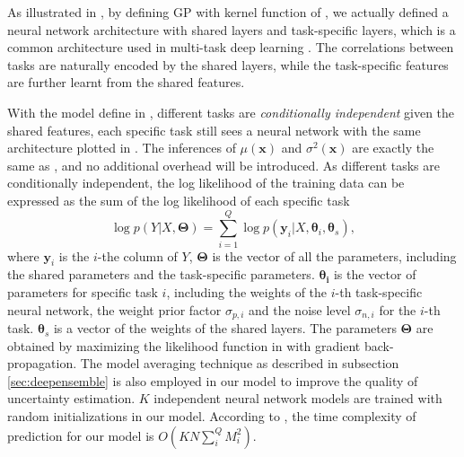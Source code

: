 As illustrated in , by defining GP with kernel function of , we actually defined a neural network architecture with shared layers and task-specific layers, which is a common architecture used in multi-task deep learning \cite{ruder2017overview}. The correlations between tasks are naturally encoded by the shared layers, while the task-specific features are further learnt from the shared features.

With the model define in , different tasks are \emph{conditionally independent} given the shared features, each specific task still sees a neural network with the same architecture plotted in . The inferences of $\mu(\bm{x})$ and $\sigma^2(\bm{x})$ are exactly the same as , and no additional overhead will be introduced. As different tasks are conditionally independent, the log likelihood of the training data can be expressed as the sum of the log likelihood of each specific task
\begin{equation}
    \label{eq:mo_likelihood}
    \log p(Y | X, \bm{\Theta}) = \sum_{i=1}^Q \log p(\bm{y}_i | X, \bm{\theta}_i, \bm{\theta}_s),
\end{equation}
where $\bm{y}_i$ is the $i$-the column of $Y$, $\bm{\Theta}$ is the vector of all the parameters, including the shared parameters and the task-specific parameters. $\bm{\theta_i}$ is the vector of parameters for specific task $i$, including the weights of the $i$-th task-specific neural network, the weight prior factor $\sigma_{p, i}$ and the noise level $\sigma_{n, i}$ for the $i$-th task. $\bm{\theta}_s$ is a vector of the weights of the shared layers. The parameters $\bm{\Theta}$ are obtained by maximizing the likelihood function in  with gradient back-propagation. The model averaging technique as described in subsection \ref{sec:deepensemble} is also employed in our model to improve the quality of uncertainty estimation. $K$ independent neural network models are trained with random initializations in our model. According to , the time complexity of prediction for our model is $O(KN\sum_i^Q M_i^2)$.
